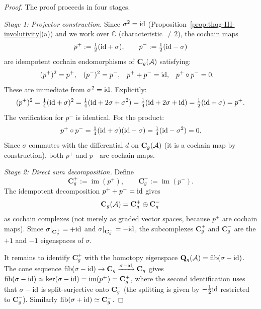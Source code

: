 \begin{proof}
The proof proceeds in four stages.

\emph{Stage 1: Projector construction.}
Since $\sigma^2 = \mathrm{id}$
(Proposition~\ref{prop:thqg-III-involutivity}(a)) and we
work over $\mathbb{C}$ (characteristic $\ne 2$), the cochain
maps
\begin{equation}\label{eq:thqg-III-projectors}
p^+ := \tfrac{1}{2}(\mathrm{id} + \sigma),
\qquad
p^- := \tfrac{1}{2}(\mathrm{id} - \sigma)
\end{equation}
are idempotent cochain endomorphisms of $\mathbf{C}_g(\mathcal{A})$
satisfying:
\begin{align}
(p^+)^2 &= p^+, &
(p^-)^2 &= p^-, &
p^+ + p^- &= \mathrm{id}, &
p^+ \circ p^- &= 0.
\label{eq:thqg-III-projector-properties}
\end{align}
These are immediate from $\sigma^2 = \mathrm{id}$. Explicitly:
\[
(p^+)^2
= \tfrac{1}{4}(\mathrm{id} + \sigma)^2
= \tfrac{1}{4}(\mathrm{id} + 2\sigma + \sigma^2)
= \tfrac{1}{4}(\mathrm{id} + 2\sigma + \mathrm{id})
= \tfrac{1}{2}(\mathrm{id} + \sigma)
= p^+.
\]
The verification for $p^-$ is identical. For the product:
\[
p^+ \circ p^-
= \tfrac{1}{4}(\mathrm{id} + \sigma)(\mathrm{id} - \sigma)
= \tfrac{1}{4}(\mathrm{id} - \sigma^2)
= 0.
\]
Since $\sigma$ commutes with the differential
$d$ on $\mathbf{C}_g(\mathcal{A})$ (it is a cochain map by
construction), both $p^+$ and $p^-$ are cochain maps.

\emph{Stage 2: Direct sum decomposition.}
Define
\[
\mathbf{C}_g^+ := \operatorname{im}(p^+),
\qquad
\mathbf{C}_g^- := \operatorname{im}(p^-).
\]
The idempotent decomposition $p^+ + p^- = \mathrm{id}$ gives
\begin{equation}\label{eq:thqg-III-direct-sum}
\mathbf{C}_g(\mathcal{A}) = \mathbf{C}_g^+ \oplus \mathbf{C}_g^-
\end{equation}
as cochain complexes (not merely as graded vector spaces,
because $p^\pm$ are cochain maps). Since
$\sigma|_{\mathbf{C}_g^+} = +\mathrm{id}$ and
$\sigma|_{\mathbf{C}_g^-} = -\mathrm{id}$, the subcomplexes
$\mathbf{C}_g^+$ and $\mathbf{C}_g^-$ are the $+1$ and $-1$
eigenspaces of $\sigma$.

It remains to identify $\mathbf{C}_g^+$ with the homotopy
eigenspace $\mathbf{Q}_g(\mathcal{A}) = \operatorname{fib}(\sigma - \mathrm{id})$.
The cone sequence
$\operatorname{fib}(\sigma - \mathrm{id}) \to \mathbf{C}_g
\xrightarrow{\sigma - \mathrm{id}} \mathbf{C}_g$
gives $\operatorname{fib}(\sigma - \mathrm{id}) \simeq
\ker(\sigma - \mathrm{id}) = \operatorname{im}(p^+) = \mathbf{C}_g^+$,
where the second identification uses that $\sigma - \mathrm{id}$ is
split-surjective onto $\mathbf{C}_g^-$ (the splitting is given
by $-\tfrac{1}{2}\mathrm{id}$ restricted to $\mathbf{C}_g^-$).
Similarly $\operatorname{fib}(\sigma + \mathrm{id}) \simeq \mathbf{C}_g^-$.


\end{proof}
